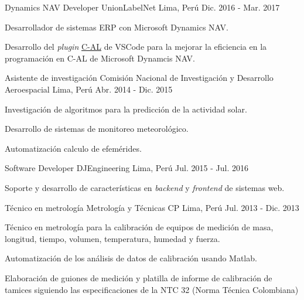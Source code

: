 \begin{cventries}
  \cventry
    {Dynamics NAV Developer} %
    {UnionLabelNet} %
    {Lima, Perú} %
    {Dic. 2016 - Mar. 2017} %
    {
      \begin{cvitems} %
        \item {Desarrollador de sistemas ERP con Microsoft Dynamics NAV.}
        \item {Desarrollo del \textit{plugin} \href{https://goo.gl/4iA8ma}{C-AL} de VSCode para la mejorar la
        eficiencia en la programación en C-AL de Microsoft Dynamcis NAV.}
      \end{cvitems}
    }

  \cventry
    {Asistente de investigación} %
    {Comisión Nacional de Investigación y Desarrollo Aeroespacial} %
    {Lima, Perú} %
    {Abr. 2014 - Dic. 2015} %
    {
      \begin{cvitems} %
        \item {Investigación de algoritmos para la  predicción de la actividad
        solar.}
        \item {Desarrollo de sistemas de monitoreo meteorológico.}
        \item {Automatización calculo de efemérides.}
      \end{cvitems}
    }

  \cventry
    {Software Developer} %
    {DJEngineering} %
    {Lima, Perú} %
    {Jul. 2015 - Jul. 2016} %
    {
      \begin{cvitems} %
        \item {Soporte y desarrollo de características en \textit{backend} y \textit{frontend} de
        sistemas web.}
      \end{cvitems}
    }

  \cventry
    {Técnico en metrología} %
    {Metrología y Técnicas CP} %
    {Lima, Perú} %
    {Jul. 2013 - Dic. 2013} %
    {
      \begin{cvitems} %
        \item {Técnico en metrología para la calibración de equipos de medición
        de masa, longitud, tiempo, volumen, temperatura, humedad y fuerza.}
        \item {Automatización de los análisis de datos de calibración usando
        Matlab.}
        \item {Elaboración de guiones de medición y platilla de informe de
        calibración de tamices siguiendo las especificaciones de la NTC 32
        (Norma Técnica Colombiana)}
      \end{cvitems}
    }


\end{cventries}
